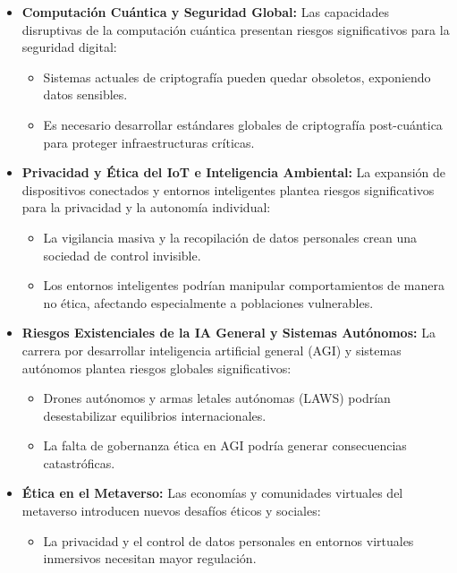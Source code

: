 \begin{refsection}
\begin{itemize}
\item \textbf{Computación Cuántica y Seguridad Global:}  
Las capacidades disruptivas de la computación cuántica presentan riesgos significativos para la seguridad digital:
\begin{itemize}
    \item Sistemas actuales de criptografía pueden quedar obsoletos, exponiendo datos sensibles.
    \item Es necesario desarrollar estándares globales de criptografía post-cuántica para proteger infraestructuras críticas.
\end{itemize}

\item \textbf{Privacidad y Ética del IoT e Inteligencia Ambiental:}  
La expansión de dispositivos conectados y entornos inteligentes plantea riesgos significativos para la privacidad y la autonomía individual:
\begin{itemize}
    \item La vigilancia masiva y la recopilación de datos personales crean una sociedad de control invisible.
    \item Los entornos inteligentes podrían manipular comportamientos de manera no ética, afectando especialmente a poblaciones vulnerables.
\end{itemize}

\item \textbf{Riesgos Existenciales de la IA General y Sistemas Autónomos:}  
La carrera por desarrollar inteligencia artificial general (AGI) y sistemas autónomos plantea riesgos globales significativos:
\begin{itemize}
    \item Drones autónomos y armas letales autónomas (LAWS) podrían desestabilizar equilibrios internacionales.
    \item La falta de gobernanza ética en AGI podría generar consecuencias catastróficas.
\end{itemize}

\item \textbf{Ética en el Metaverso:}  
Las economías y comunidades virtuales del metaverso introducen nuevos desafíos éticos y sociales:
\begin{itemize}
    \item La privacidad y el control de datos personales en entornos virtuales inmersivos necesitan mayor regulación.
\end{itemize}


\end{itemize}
\end{refsection}

